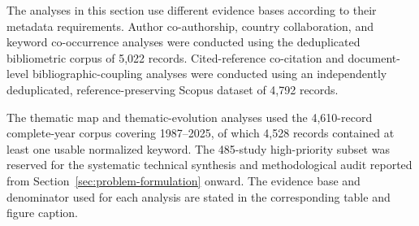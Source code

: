 \documentclass[pdflatex,sn-mathphys-num]{sn-jnl}%
\theoremstyle{thmstyleone}%
\theoremstyle{thmstyletwo}%
\theoremstyle{thmstylethree}%
\begin{document}
The analyses in this section use different evidence bases according
to their metadata requirements. Author co-authorship, country
collaboration, and keyword co-occurrence analyses were conducted using
the deduplicated bibliometric corpus of 5,022 records.
Cited-reference co-citation and document-level bibliographic-coupling
analyses were conducted using an independently deduplicated,
reference-preserving Scopus dataset of 4,792 records.

The thematic map and thematic-evolution analyses used the
4,610-record complete-year corpus covering 1987--2025, of which
4,528 records contained at least one usable normalized keyword.
The 485-study high-priority subset was reserved for the systematic
technical synthesis and methodological audit reported from
Section~\ref{sec:problem-formulation} onward. The evidence base and
denominator used for each analysis are stated in the corresponding
table and figure caption.
\end{document}
